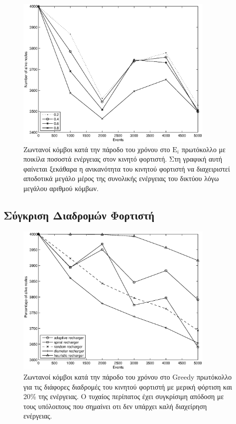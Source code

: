 \begin{figure}[H]
  \centering
   \includegraphics[width=0.85\textwidth]{experiments/4000nodes/3.smallVSbigpercentage/alive_nodes_ei_rc_per_our.eps}
  \caption{Ζωντανοί κόμβοι κατά την πάροδο του χρόνου στο $\text{E}_{i}$ πρωτόκολλο με ποικίλα ποσοστά ενέργειας στον κινητό φορτιστή. Στη γραφική αυτή φαίνεται
ξεκάθαρα η ανικανότητα του κινητού φορτιστή να διαχειριστεί αποδοτικά μεγάλο μέρος της συνολικής ενέργειας του δικτύου λόγω μεγάλου αριθμού κόμβων.}
  \label{fig:5_3exp_1_3}
\end{figure}

\subsection{Σύγκριση Διαδρομών Φορτιστή}\label{subc:result6_4}
\begin{figure}[H]
  \centering
  \includegraphics[width=0.85\textwidth]{experiments/4000nodes/4.ourVSnaive/alive_nodes_greedy_rc_per_our-spiral-random-diameter-heuristic.eps}
  \caption{Ζωντανοί κόμβοι κατά την πάροδο του χρόνου στο Greedy πρωτόκολλο για τις διάφορες διαδρομές του κινητού φορτιστή με μερική φόρτιση και 20\% της
ενέργειας. Ο τυχαίος περίπατος έχει συγκρίσιμη απόδοση με τους υπόλοιπους που σημαίνει οτι δεν υπάρχει καλή διαχείρηση ενέργειας.}
  \label{fig:5_4exp_1_1}
\end{figure}

